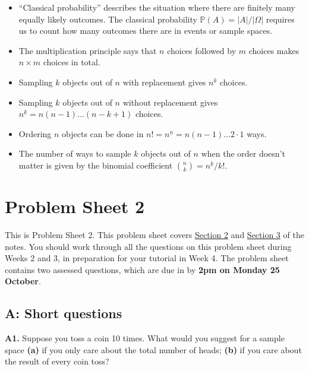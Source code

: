 \documentclass[
  a4paper,
]{book}
\providecommand{\tightlist}{%
  \setlength{\itemsep}{0pt}\setlength{\parskip}{0pt}}
\newif\ifcomm\commtrue
\theoremstyle{definition}
\theoremstyle{definition}
\theoremstyle{definition}
\theoremstyle{definition}
\theoremstyle{remark}
\begin{document}
\begin{itemize}
\tightlist
\item
  ``Classical probability'' describes the situation where there are finitely many equally likely outcomes. The classical probability \(\mathbb P(A) = |A|/|\Omega|\) requires us to count how many outcomes there are in events or sample spaces.
\item
  The multiplication principle says that \(n\) choices followed by \(m\) choices makes \(n \times m\) choices in total.
\item
  Sampling \(k\) objects out of \(n\) with replacement gives \(n^k\) choices.
\item
  Sampling \(k\) objects out of \(n\) without replacement gives \(n^{\underline{k}} = n(n-1)\dots(n-k+1)\) choices.
\item
  Ordering \(n\) objects can be done in \(n! = n^{\underline{n}} = n(n-1)\dots2\cdot1\) ways.
\item
  The number of ways to sample \(k\) objects out of \(n\) when the order doesn't matter is given by the binomial coefficient \(\binom nk = {n}^{\underline{k}}/k!\).
\end{itemize}

\hypertarget{P2}{%
\chapter*{Problem Sheet 2}\label{P2}}

\commfalse

This is Problem Sheet 2. This problem sheet covers \protect\hyperlink{S02-probability}{Section 2} and \protect\hyperlink{S03-classical}{Section 3} of the notes. You should work through all the questions on this problem sheet during Weeks 2 and 3, in preparation for your tutorial in Week 4. The problem sheet contains two assessed questions, which are due in by \textbf{2pm on Monday 25 October}.

\hypertarget{P2-short}{%
\section*{A: Short questions}\label{P2-short}}

\textbf{A1.} Suppose you toss a coin 10 times. What would you suggest for a sample space \textbf{(a)} if you only care about the total number of heads; \textbf{(b)} if you care about the result of every coin toss?
\end{document}

